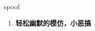 
\begin{frame}
{\huge spoof}
\begin{center}
\begin{enumerate}\Large
  \item \textbf{轻松幽默的模仿，小恶搞}
\end{enumerate}
\end{center}
\end{frame}
